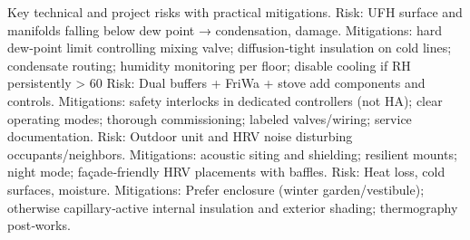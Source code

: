 \markdownRendererDocumentBegin
\markdownRendererSectionBegin
{}\markdownRendererInterblockSeparator
{}Key technical and project risks with practical mitigations.\markdownRendererInterblockSeparator
{}\markdownRendererSectionBegin
{}\markdownRendererInterblockSeparator
{}\markdownRendererUlBeginTight
\markdownRendererUlItem Risk: UFH surface and manifolds falling below dew point → condensation, damage.\markdownRendererUlItemEnd 
\markdownRendererUlItem Mitigations: hard dew‑point limit controlling mixing valve; diffusion‑tight insulation on cold lines; condensate routing; humidity monitoring per floor; disable cooling if RH persistently > 60\markdownRendererUlItemEnd 
\markdownRendererUlEndTight \markdownRendererInterblockSeparator
{}
\markdownRendererSectionEnd \markdownRendererSectionBegin
{}\markdownRendererInterblockSeparator
{}\markdownRendererUlBeginTight
\markdownRendererUlItem Risk: Dual buffers + FriWa + stove add components and controls.\markdownRendererUlItemEnd 
\markdownRendererUlItem Mitigations: safety interlocks in dedicated controllers (not HA); clear operating modes; thorough commissioning; labeled valves/wiring; service documentation.\markdownRendererUlItemEnd 
\markdownRendererUlEndTight \markdownRendererInterblockSeparator
{}
\markdownRendererSectionEnd \markdownRendererSectionBegin
{}\markdownRendererInterblockSeparator
{}\markdownRendererUlBeginTight
\markdownRendererUlItem Risk: Outdoor unit and HRV noise disturbing occupants/neighbors.\markdownRendererUlItemEnd 
\markdownRendererUlItem Mitigations: acoustic siting and shielding; resilient mounts; night mode; façade‑friendly HRV placements with baffles.\markdownRendererUlItemEnd 
\markdownRendererUlEndTight \markdownRendererInterblockSeparator
{}
\markdownRendererSectionEnd \markdownRendererSectionBegin
{}\markdownRendererInterblockSeparator
{}\markdownRendererUlBeginTight
\markdownRendererUlItem Risk: Heat loss, cold surfaces, moisture.\markdownRendererUlItemEnd 
\markdownRendererUlItem Mitigations: Prefer enclosure (winter garden/vestibule); otherwise capillary‑active internal insulation and exterior shading; thermography post‑works.\markdownRendererUlItemEnd 
\markdownRendererUlEndTight \markdownRendererInterblockSeparator
{}
\markdownRendererSectionEnd \markdownRendererSectionBegin
{}\markdownRendererInterblockSeparator
